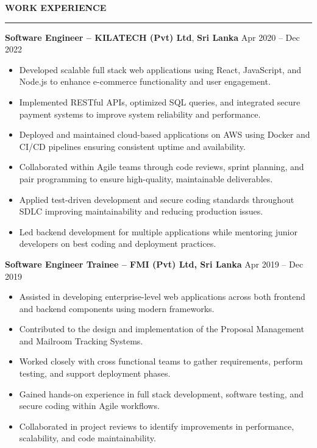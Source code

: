 \documentclass[10pt,letterpaper]{article}
\begin{document}
\textbf{WORK EXPERIENCE}\\[-8pt]
\noindent\rule{\textwidth}{1pt}

\vspace{-2pt}

\textbf{Software Engineer -- KILATECH (Pvt) Ltd}, \textbf{Sri Lanka} \hfill Apr 2020 -- Dec 2022

\vspace{-1pt}

\begin{itemize}
\item Developed scalable full stack web applications using React, JavaScript, and Node.js to enhance e-commerce functionality and user engagement.
\item Implemented RESTful APIs, optimized SQL queries, and integrated secure payment systems to improve system reliability and performance.
\item Deployed and maintained cloud-based applications on AWS using Docker and CI/CD pipelines ensuring consistent uptime and availability.
\item Collaborated within Agile teams through code reviews, sprint planning, and pair programming to ensure high-quality, maintainable deliverables.
\item Applied test-driven development and secure coding standards throughout SDLC improving maintainability and reducing production issues.
\item Led backend development for multiple applications while mentoring junior developers on best coding and deployment practices.
\end{itemize}

\textbf{Software Engineer Trainee -- FMI (Pvt) Ltd, Sri Lanka} \hfill Apr 2019 -- Dec 2019

\vspace{-1pt}

\begin{itemize}
\item Assisted in developing enterprise-level web applications across both frontend and backend components using modern frameworks.
\item Contributed to the design and implementation of the Proposal Management and Mailroom Tracking Systems.
\item Worked closely with cross functional teams to gather requirements, perform testing, and support deployment phases.
\item Gained hands-on experience in full stack development, software testing, and secure coding within Agile workflows.
\item Collaborated in project reviews to identify improvements in performance, scalability, and code maintainability.
\end{itemize}
\end{document}
